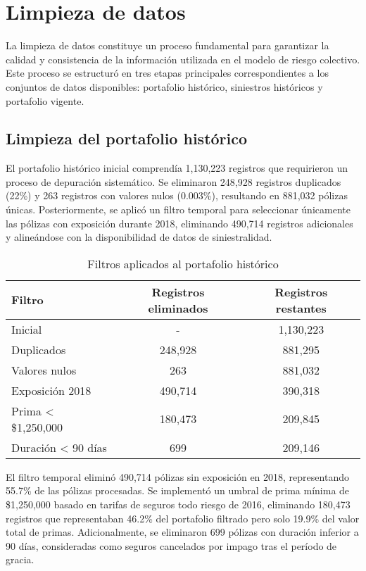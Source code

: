 \section{Limpieza de datos}

La limpieza de datos constituye un proceso fundamental para garantizar la calidad y consistencia de la información utilizada en el modelo de riesgo colectivo. Este proceso se estructuró en tres etapas principales correspondientes a los conjuntos de datos disponibles: portafolio histórico, siniestros históricos y portafolio vigente.

\subsection{Limpieza del portafolio histórico}

El portafolio histórico inicial comprendía 1,130,223 registros que requirieron un proceso de depuración sistemático. Se eliminaron 248,928 registros duplicados (22\%) y 263 registros con valores nulos (0.003\%), resultando en 881,032 pólizas únicas. Posteriormente, se aplicó un filtro temporal para seleccionar únicamente las pólizas con exposición durante 2018, eliminando 490,714 registros adicionales y alineándose con la disponibilidad de datos de siniestralidad.

\begin{table}[H]
\centering
\caption{Filtros aplicados al portafolio histórico}
\begin{tabular}{lcc}
\hline
\textbf{Filtro} & \textbf{Registros eliminados} & \textbf{Registros restantes} \\
\hline
Inicial & - & 1,130,223 \\
Duplicados & 248,928 & 881,295 \\
Valores nulos & 263 & 881,032 \\
Exposición 2018 & 490,714 & 390,318 \\
Prima < \$1,250,000 & 180,473 & 209,845 \\
Duración < 90 días & 699 & 209,146 \\
\hline
\end{tabular}
\end{table}

El filtro temporal eliminó 490,714 pólizas sin exposición en 2018, representando 55.7\% de las pólizas procesadas. Se implementó un umbral de prima mínima de \$1,250,000 basado en tarifas de seguros todo riesgo de 2016, eliminando 180,473 registros que representaban 46.2\% del portafolio filtrado pero solo 19.9\% del valor total de primas. Adicionalmente, se eliminaron 699 pólizas con duración inferior a 90 días, consideradas como seguros cancelados por impago tras el período de gracia.

